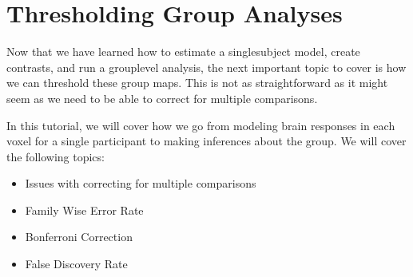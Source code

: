 \documentclass[letterpaper,10pt,english]{sphinxmanual}
\begin{document}
\begin{sphinxVerbatim}[commandchars=\\\{\}]
    

  
   

   \PYG{p}{[}\PYG{p}{]} 
\end{sphinxVerbatim}


\section{Thresholding Group Analyses}
\label{\detokenize{content/Thresholding_Group_Analyses:thresholding-group-analyses}}\label{\detokenize{content/Thresholding_Group_Analyses::doc}}

Now that we have learned how to estimate a single\sphinxhyphen{}subject model, create contrasts, and run a group\sphinxhyphen{}level analysis, the next important topic to cover is how we can threshold these group maps. This is not as straightforward as it might seem as we need to be able to correct for multiple comparisons.

In this tutorial, we will cover how we go from modeling brain responses in each voxel for a single participant to making inferences about the group. We will cover the following topics:
\begin{itemize}
\item {} 
Issues with correcting for multiple comparisons

\item {} 
Family Wise Error Rate

\item {} 
Bonferroni Correction

\item {} 
False Discovery Rate

\end{itemize}
\end{document}
